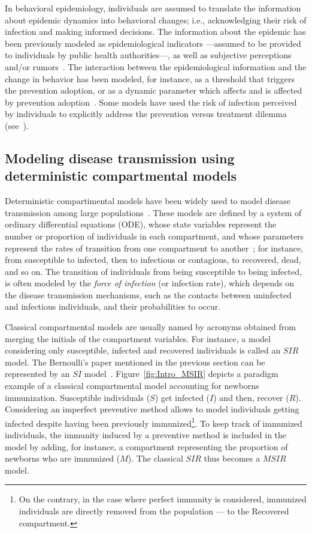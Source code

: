 In behavioral epidemiology, individuals are assumed to translate the information about epidemic dynamics into behavioral changes; i.e., acknowledging their risk of infection and making informed decisions. The information about the epidemic has been previously modeled as epidemiological indicators ---assumed to be provided to individuals by public health authorities---, as well as subjective perceptions and/or rumors~\cite[]{Verelst2016}. The interaction between the epidemiological information and the change in behavior has been modeled, for instance, as a threshold that triggers the prevention adoption, or as a dynamic parameter which affects and is affected by prevention adoption~\cite[]{Verelst2016}. Some models have used the risk of infection perceived by individuals to explicitly address the prevention versus treatment dilemma (see~).

 
							
\subsection{Modeling disease transmission using deterministic compartmental models}

Deterministic compartimental models have been widely used to model disease transmission among large populations~\cite[]{Brauer2017}. These models are defined by a system of ordinary differential equations (ODE), whose state variables represent the number or proportion of individuals in each compartment, and whose parameters represent the rates of transition from one compartment to another~\cite[]{Hethcote2000}; for instance, from susceptible to infected, then to infectious or contagious, to recovered, dead, and so on. The transition of individuals from being susceptible to being infected, is often modeled by the \textit{force of infection} (or infection rate), which depends on the disease transmission mechanisms, such as the contacts between uninfected and infectious individuals, and their probabilities to occur. 

Classical compartmental models are usually named by acronyms obtained from merging the initials of the compartment variables. For instance, a model considering only susceptible, infected and recovered individuals is called an $SIR$ model. The Bernoulli's paper mentioned in the previous section can be represented by an $SI$ model~\cite[]{Dietz2002}. 
%
Figure~\ref{fig:Intro_MSIR} depicts a paradigm example of a classical compartmental model accounting for newborns immunization. Susceptible individuals ($S$) get infected ($I$) and then, recover ($R$). Considering an imperfect preventive method allows to model individuals getting infected despite having been previously immunized\footnote{On the contrary, in the case where perfect immunity is considered, immunized individuals are directly removed from the population --- to the Recovered compartment.}. To keep track of immunized individuals, the immunity induced by a preventive method is included in the model by adding, for instance, a compartment representing the proportion of newborns who are immunized ($M$). The classical $SIR$ thus becomes a $MSIR$ model.

